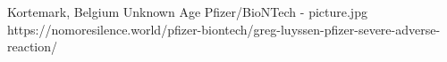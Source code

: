 {Kortemark, Belgium}
{Unknown Age}
{Pfizer/BioNTech}
{}
{-}
{picture.jpg}
{https://nomoresilence.world/pfizer-biontech/greg-luyssen-pfizer-severe-adverse-reaction/}
{
}
